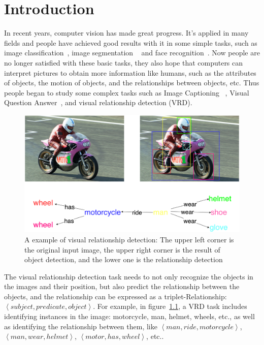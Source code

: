 \chapter{Introduction}
\label{chap:introduction}
\setcounter{page}{1}

In recent years, computer vision has made great progress. It's applied in many fields and people have achieved good results with it in some simple tasks, such as image classification~\cite{yu2017convolutional, lu2007survey}, image segmentation ~\cite{pham2000current} and face recognition~\cite{ahonen2006face, phillips1996feret}. Now people are no longer satisfied with these basic tasks, they also hope that computers can interpret pictures to obtain more information like humans, such as the attributes of objects,  the motion of objects, and the relationships between objects, etc. Thus people began to study some complex tasks such as Image Captioning ~\cite{hossain2019comprehensive},  Visual Question Answer~\cite{antol2015vqa}, and visual relationship detection (VRD). 

\begin{figure}[!htbp]
	\centering
	\includegraphics[width = 0.9 \textwidth]{figures/senen_graph.png}
	\caption[A example of visual relationship detection]
	{ A example of visual relationship detection: The upper left corner is the original input image, the upper right corner is the result of object detection, and the lower one is the relationship detection}
	\label{fig:sene}
\end{figure}

The visual relationship detection task needs to not only recognize the objects
in the images and their position, but also predict the relationship between the 
objects, and the relationship can be expressed as a triplet-Relationship: $\left \langle subject, predicate, object\right \rangle$. For example, in figure~\ref{fig:sene}, a VRD task includes identifying instances in the image: motorcycle, man, helmet, wheels, etc., as well as identifying the relationship between them, like $\left \langle man, ride, motorcycle\right \rangle$, $\left \langle man, wear, helmet\right \rangle$, $\left \langle motor, has, wheel\right \rangle$, etc..


